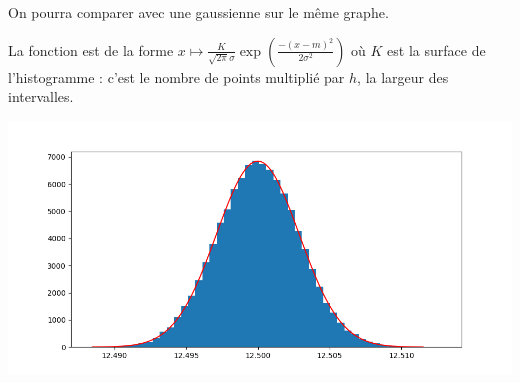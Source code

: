 On pourra comparer avec une gaussienne sur le même graphe.

La fonction est de la forme $\displaystyle x \mapsto \frac{K}{\sqrt{2\pi}\sigma}\exp\left(\frac{-(x-m)^2}{2\sigma^2}\right)$ 
où $K$ est la surface de l'histogramme : c'est le nombre de points multiplié par $h$, la largeur des intervalles.
\begin{center}
\includegraphics[scale=0.6]{TP/Images/TP17_histo7.png}
\end{center}


